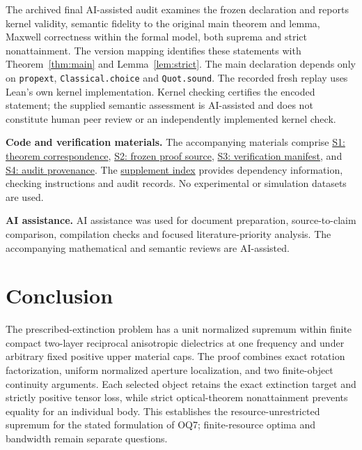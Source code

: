\documentclass[11pt]{article}
\begin{document}
The archived final AI-assisted audit examines the frozen declaration and reports kernel validity, semantic fidelity to the original main theorem and lemma, Maxwell correctness within the formal model, both suprema and strict nonattainment. The version mapping identifies these statements with Theorem~\ref{thm:main} and Lemma~\ref{lem:strict}. The main declaration depends only on \texttt{propext}, \texttt{Classical.choice} and \texttt{Quot.sound}. The recorded fresh replay uses Lean's own kernel implementation. Kernel checking certifies the encoded statement; the supplied semantic assessment is AI-assisted and does not constitute human peer review or an independently implemented kernel check.

\noindent\textbf{Code and verification materials.}
The accompanying materials comprise
\href{theorem-correspondence.html}{S1: theorem correspondence},
\href{reproducibility/OQ7-complete-physical-theorem11-source.zip}{S2: frozen proof source},
\href{reproducibility/manifest.json}{S3: verification manifest}, and
\href{reproducibility/AUDIT_PROVENANCE.md}{S4: audit provenance}.
The \href{reproducibility/SUPPLEMENT_INDEX.html}{supplement index}
provides dependency information, checking instructions and audit records. No experimental or simulation datasets are used.

\noindent\textbf{AI assistance.}
AI assistance was used for document preparation, source-to-claim comparison, compilation checks and focused literature-priority analysis. The accompanying mathematical and semantic reviews are AI-assisted.

\section{Conclusion}\label{sec:conclusion}
The prescribed-extinction problem has a unit normalized supremum within finite compact two-layer reciprocal anisotropic dielectrics at one frequency and under arbitrary fixed positive upper material caps. The proof combines exact rotation factorization, uniform normalized aperture localization, and two finite-object continuity arguments. Each selected object retains the exact extinction target and strictly positive tensor loss, while strict optical-theorem nonattainment prevents equality for an individual body. This establishes the resource-unrestricted supremum for the stated formulation of OQ7; finite-resource optima and bandwidth remain separate questions.

\appendix
\end{document}
